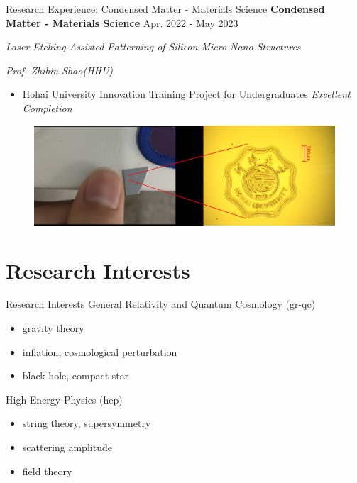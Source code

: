 \documentclass[9pt,aspectratio=169,hyperref=colorlinks]{beamer}
\begin{document}
\begin{frame}{Research Experience: Condensed Matter - Materials Science}
    \medskip \textbf{Condensed Matter - Materials Science} \hfill Apr. 2022 - May 2023

    \quad \textit{Laser Etching-Assisted Patterning of Silicon Micro-Nano Structures}

    \hfill \textit{Prof. Zhibin Shao(HHU)}

    \begin{itemize}
        \item Hohai University Innovation Training Project for Undergraduates \textit{Excellent Completion}
    \end{itemize}

    \begin{figure}
        \centering
        \includegraphics[scale=0.59]{CV/figs/Laser Etching-Assisted Patterning of Silicon Micro-Nano Structures.png}
    \end{figure}
\end{frame}

\section{Research Interests}
\begin{frame}{Research Interests}
    General Relativity and Quantum Cosmology (gr-qc)
    \begin{itemize}
        \item gravity theory
        \item inflation, cosmological perturbation
        \item black hole, compact star
    \end{itemize}

    High Energy Physics (hep)
    \begin{itemize}
        \item string theory, supersymmetry
        \item scattering amplitude
        \item field theory
    \end{itemize}
\end{frame}
\end{document}
